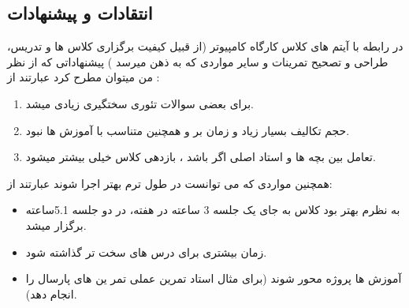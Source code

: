 \documentclass[twoside]{article}
\newcommand{\نام}{محمدعرفان سلیما}
\newcommand{\گروه}{2}
\begin{document}
\subsection*{انتقادات و پیشنهادات}
در رابطه با آیتم های کلاس کارگاه کامپیوتر (از قبیل کیفیت برگزاری کلاس ها و تدریس، طراحی و تصحیح تمرینات و سایر مواردی که به ذهن میرسد )
پیشنهاداتی که از نظر من میتوان مطرح کرد عبارتند از :
\begin{enumerate}
    \item 
    برای بعضی سوالات تئوری سختگیری زیادی میشد.
    \item
    حجم تکالیف بسیار زیاد و زمان بر و همچنین متناسب با آموزش ها نبود.
    \item
    تعامل بین بچه ها و استاد اصلی اگر باشد ، بازدهی کلاس خیلی بیشتر میشود.
    
\end{enumerate}
همچنین مواردی که می توانست در طول ترم بهتر اجرا شوند عبارتند از:
\begin{itemize}
    \item 
    به نظرم بهتر بود کلاس به جای یک جلسه 3 ساعته در هفته، در دو جلسه 5.1ساعته برگزار میشد.
    \item
    زمان بیشتری برای درس های سخت تر گذاشته شود.
    \item
    آموزش ها پروژه محور شوند (برای مثال استاد تمرین عملی تمر
    ین های پارسال را انجام دهد).\end{itemize}
\end{document}
